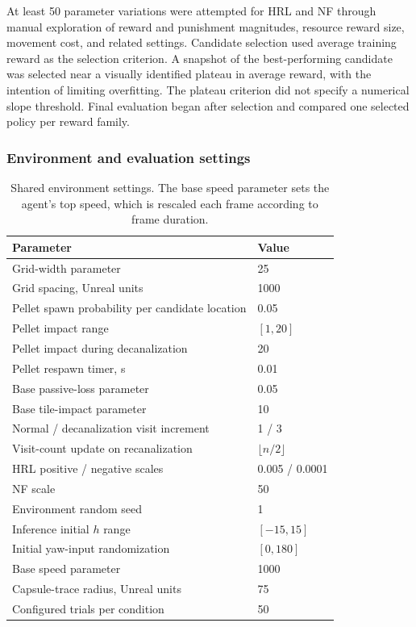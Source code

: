 At least 50 parameter variations were attempted for HRL and NF through manual exploration of reward and punishment magnitudes, resource reward size, movement cost, and related settings. Candidate selection used average training reward as the selection criterion. A snapshot of the best-performing candidate was selected near a visually identified plateau in average reward, with the intention of limiting overfitting. The plateau criterion did not specify a numerical slope threshold. Final evaluation began after selection and compared one selected policy per reward family.

\subsubsection{Environment and evaluation settings}

\begin{table}[H]
  \centering
  \small
  \begin{tabularx}{\linewidth}{@{}Xl@{}}
    \toprule
    \textbf{Parameter} & \textbf{Value} \\
    \midrule
    Grid-width parameter & 25 \\
    Grid spacing, Unreal units & 1000 \\
    Pellet spawn probability per candidate location & 0.05 \\
    Pellet impact range & $[1,20]$ \\
    Pellet impact during decanalization & 20 \\
    Pellet respawn timer, s & 0.01 \\
    Base passive-loss parameter & 0.05 \\
    Base tile-impact parameter & 10 \\
    Normal / decanalization visit increment & 1 / 3 \\
    Visit-count update on recanalization & $\lfloor n/2\rfloor$ \\
    HRL positive / negative scales & 0.005 / 0.0001 \\
    NF scale & 50 \\
    Environment random seed & 1 \\
    Inference initial $h$ range & $[-15,15]$ \\
    Initial yaw-input randomization & $[0,180]$ \\
    Base speed parameter & 1000 \\
    Capsule-trace radius, Unreal units & 75 \\
    Configured trials per condition & 50 \\
    \bottomrule
  \end{tabularx}
  \caption{Shared environment settings. The base speed parameter sets the agent's top speed, which is rescaled each frame according to frame duration.}
  \label{tab:environment-settings}
\end{table}

